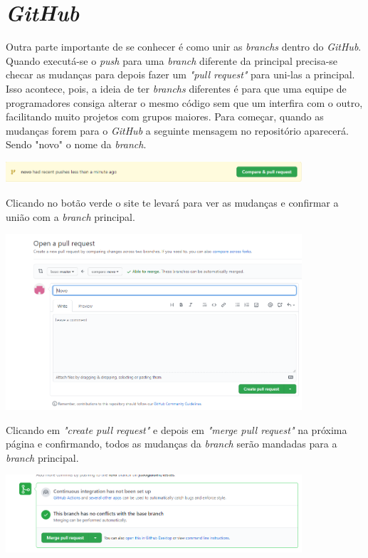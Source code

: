 \documentclass{article}
\begin{document}
\section{\textit{GitHub}}

\hspace{4mm}Outra parte importante de se conhecer é como unir as \textit{branchs} dentro do \textit{GitHub}. Quando executá-se o \textit{push} para uma \textit{branch} diferente da principal precisa-se checar as mudanças para depois fazer um \textit{"pull request"} para uni-las a principal. Isso acontece, pois, a ideia de ter \textit{branchs} diferentes é para que uma equipe de programadores consiga alterar o mesmo código sem que um interfira com o outro, facilitando muito projetos com grupos maiores. Para começar, quando as mudanças forem para o \textit{GitHub} a seguinte mensagem no repositório aparecerá. Sendo  "novo" o nome da \textit{branch}.

\includegraphics[width = 11cm]{images/gitHubPush.png}

Clicando no botão verde o site te levará para ver as mudanças e confirmar a união com a \textit{branch} principal.

\includegraphics[width = 11cm]{images/pull.png}

Clicando em \textit{"create pull request"} e depois em \textit{"merge pull request"} na próxima página e confirmando, todos as mudanças da \textit{branch} serão mandadas para a \textit{branch} principal.

\includegraphics[width = 11cm]{images/merge.png}
\end{document}
